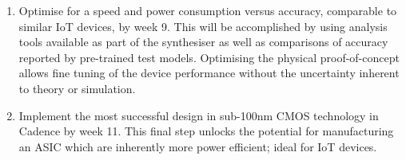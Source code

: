 \documentclass{article}
\begin{document}
\begin{enumerate}
    \item Optimise for a speed and power consumption versus accuracy, comparable to similar IoT devices, by week 9. This will be accomplished by using analysis tools available as part of the synthesiser as well as comparisons of accuracy reported by pre-trained test models. Optimising the physical proof-of-concept allows fine tuning of the device performance without the uncertainty inherent to theory or simulation.

    \item Implement the most successful design in sub-100nm CMOS technology in Cadence by week 11. This final step unlocks the potential for manufacturing an ASIC which are inherently more power efficient; ideal for IoT devices.
\end{enumerate}
\end{document}

